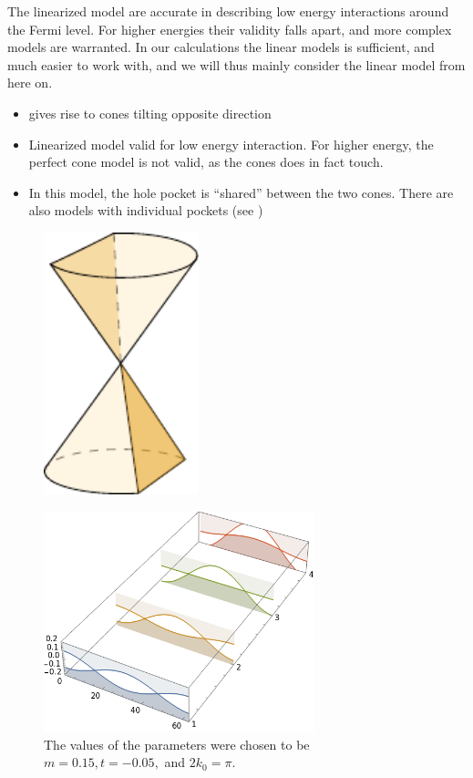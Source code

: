 The linearized model are accurate in describing low energy interactions around the Fermi level.
For higher energies their validity falls apart, and more complex models are warranted.
In our calculations the linear models is sufficient, and much easier to work with, and we will thus mainly consider the linear model from here on.

\begin{itemize}
  \item gives rise to cones tilting opposite direction
  \item Linearized model valid for low energy interaction. For higher energy, the perfect cone model is not valid, as the cones does in fact touch.
  \item In this model, the hole pocket is ``shared'' between the two cones. There are also models with individual pockets (see \cite{mccormickMinimalModelsTopological2017})
\end{itemize}

\begin{figure}[ht]
  \centering
  \includegraphics[width=0.4\textwidth]{figures/conicSection}
  \caption{\label{fig:conic-section-sketch} }
\end{figure}


\begin{figure}[ht]
  \centering
  \includegraphics[width=0.7\textwidth]{figures/typeIIridgeline}
  \caption{\label{fig:ridgeline}  The values of the parameters were chosen to be \(m=0.15, t=-0.05, \) and \(2 k_{0}=\pi\).}
\end{figure}

